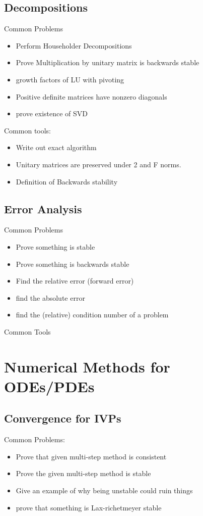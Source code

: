 \documentclass[12pt]{article}
\begin{document}
\subsection{Decompositions}
Common Problems
\begin{itemize}
	\item Perform Householder Decompositions
	\item Prove Multiplication by unitary matrix is backwards stable
	\item growth factors of LU with pivoting
	\item Positive definite matrices have nonzero diagonals
	\item prove existence of SVD
\end{itemize}

Common tools:
\begin{itemize}
	\item Write out exact algorithm
	\item Unitary matrices are preserved under 2 and F norms.
	\item Definition of Backwards stability
\end{itemize}

\subsection{Error Analysis}
Common Problems
\begin{itemize}
	\item Prove something is stable
	\item Prove something is backwards stable
	\item Find the relative error (forward error)
	\item find the absolute error
	\item find the (relative) condition number of a problem
\end{itemize}

Common Tools

\section{Numerical Methods for ODEs/PDEs}

\subsection{Convergence for IVPs}
Common Problems:
\begin{itemize}
	\item Prove that given multi-step method is consistent
	\item Prove the given multi-step method is stable
	\item Give an example of why being unstable could ruin things
	\item prove that something is Lax-richetmeyer stable
\end{itemize}
\end{document}
